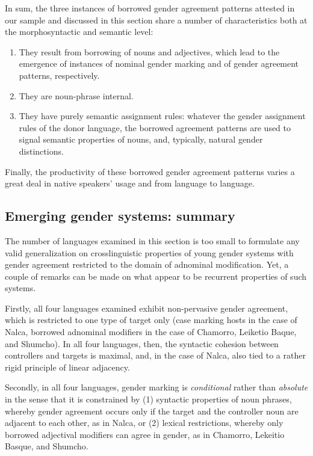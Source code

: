 \documentclass[output=collectionpaper]{langsci/langscibook}
\begin{document}
In sum,  the three instances of borrowed gender agreement patterns attested in our sample and discussed in this section share a number of characteristics both at the morphosyntactic and semantic level:
\begin{enumerate}
\item They result from borrowing of nouns and adjectives, which lead to the emergence of instances of nominal gender marking and of gender agreement patterns, respectively.
\item They are noun-phrase internal.
\item They have purely semantic assignment rules: whatever the gender assignment rules of the donor language, the borrowed agreement patterns are used to signal semantic properties of nouns, and, typically, natural gender distinctions.
\end{enumerate}

Finally, the productivity of these borrowed gender agreement patterns varies a great deal in native speakers' usage and from language to language.

\subsection{Emerging gender systems: summary}
The number of languages examined in this section is too small to formulate any valid generalization on crosslinguistic properties of young gender systems with gender agreement restricted to the domain of adnominal modification. Yet, a couple of remarks can be made on what appear to be recurrent properties of such systems.

Firstly, all four languages examined exhibit non-pervasive gender agreement, which is restricted to one type of target only (case marking hosts in the case of Nalca, borrowed adnominal modifiers in the case of Chamorro, Leiketio Baque, and Shumcho). In all four languages, then, the syntactic cohesion between controllers and targets is maximal, and, in the case of Nalca, also tied to a rather rigid principle of linear adjacency.

Secondly, in all four languages, gender marking is \textit{conditional} rather than \textit{absolute} in the sense that it is constrained by (1) syntactic properties of noun phrases, whereby gender agreement occurs only if the target and the controller noun are adjacent to each other, as in Nalca, or (2) lexical restrictions, whereby only borrowed adjectival modifiers can agree in gender, as in Chamorro, Lekeitio Basque, and Shumcho.
\end{document}
